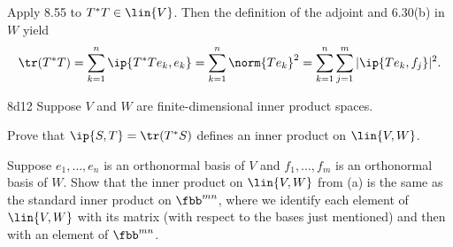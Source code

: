 \begin{sol}
    Apply 8.55 to $T^\ast T \in \lin{V}$.
    Then the definition of the adjoint and 6.30(b) in $W$ yield
    \[
        \tr(T^\ast T) = \sum_{k=1}^n \ip{T^\ast T e_k, e_k} = \sum_{k=1}^n \norm{T e_k}^2 = \sum_{k=1}^n \sum_{j=1}^m |\ip{T e_k, f_j}|^2.
    \]
\end{sol}

\begin{exercise}{8d12}
    Suppose $V$ and $W$ are finite-dimensional inner product spaces.
    \begin{subexercises}
        \item Prove that $\ip{S, T} = \tr(T^\ast S)$ defines an inner product on $\lin{V, W}$.
        \item Suppose $e_1, \ldots, e_n$ is an orthonormal basis of $V$ and $f_1, \ldots, f_m$ is an orthonormal basis of $W$.
        Show that the inner product on $\lin{V, W}$ from (a) is the same as the standard inner product on $\fbb^{mn}$, where we identify each element of $\lin{V, W}$ with its matrix (with respect to the bases just mentioned) and then with an element of $\fbb^{mn}$.
    \end{subexercises}

\end{exercise}

